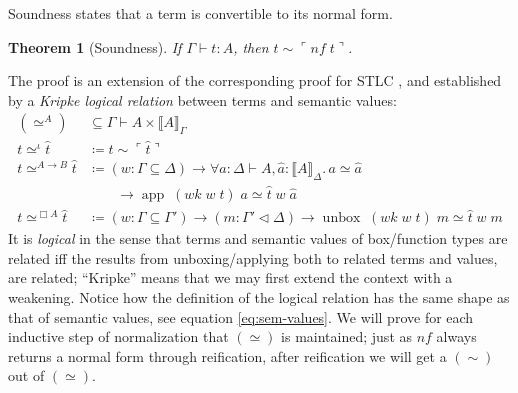 \documentclass[12pt,twoside,openright]{report}
\numberwithin{equation}{chapter}
\numberwithin{figure}{chapter}
\numberwithin{table}{chapter}
\newtheorem{theorem}{Theorem}
\theoremstyle{definition}\newtheorem{definition}{Definition}
\begin{document}
Soundness states that a term is convertible to its normal form.
\begin{theorem}[Soundness]
  If $\Gamma \vdash t : A$, then $t \sim \ulcorner \textit{nf} \; t \urcorner$.
\end{theorem}

The proof is an extension of the corresponding proof for STLC \cite{kovacs17},
and established by a \emph{Kripke logical relation} \cite{plotkin73}
between terms and semantic values:
\begin{align*}
  (\simeq^A) &\subseteq \Gamma \vdash A \times \llbracket A \rrbracket_\Gamma \\
  t \simeq^\iota \hat t &\coloneqq t \sim \ulcorner \hat t \urcorner \\
  t \simeq^{A \to B} \hat t &\coloneqq (w : \Gamma \subseteq \Delta) \to \forall a : \Delta \vdash A, \hat a : \llbracket A \rrbracket_\Delta.\, a \simeq \hat a \\
  &\qquad \to \operatorname{app} \; (\textit{wk} \; w \; t) \; a \simeq \hat t \; w \; \hat a \\
  t \simeq^{\Box A} \hat t &\coloneqq (w : \Gamma \subseteq \Gamma') \to (m : \Gamma' \lhd \Delta)
  \to \operatorname{unbox} \; (\textit{wk} \; w \; t) \; m \simeq \hat t \; w \; m
\end{align*}
It is \emph{logical} in the sense that terms and semantic values of box/function types
are related iff the results from unboxing/applying both to related terms and values, are related;
``Kripke'' means that we may first extend the context with a weakening.
Notice how the definition of the logical relation has the same shape
as that of semantic values, see equation \eqref{eq:sem-values}.
We will prove for each inductive step of normalization that $(\simeq)$ is maintained;
just as $\textit{nf}$ always returns a normal form through reification,
after reification we will get a $(\sim)$ out of $(\simeq)$.
\end{document}

